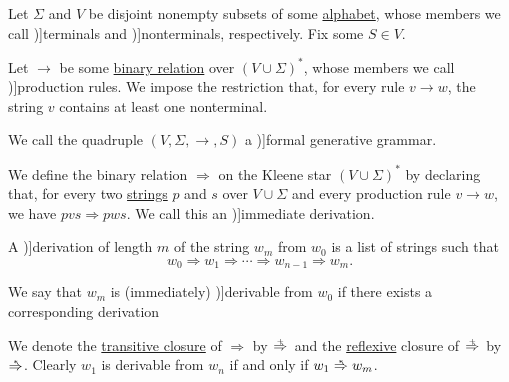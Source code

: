 \begin{definition}\label{def:formal_grammar}
  Let \( \Sigma \) and \( V \) be disjoint nonempty subsets of some \hyperref[def:formal_language]{alphabet}, whose members we call \term[ru=основные (символы) (\cite[27]{Гладкий1973Языки})]{terminals} and \term[ru=вспомогательные (символы) (\cite[27]{Гладкий1973Языки})]{nonterminals}, respectively. Fix some  \( S \in V \).

  Let \( \to \) be some \hyperref[def:binary_relation]{binary relation} over \( (V \cup \Sigma)^* \), whose members we call \term[ru=правила (\cite[27]{Гладкий1973Языки})]{production rules}. We impose the restriction that, for every rule \( v \to w \), the string \( v \) contains at least one nonterminal.

  We call the quadruple \( (V, \Sigma, \to, S) \) a \term[ru=(формальная) генеративная грамматика (\cite[10]{Гладкий1973Языки})]{formal generative grammar}.

  \begin{thmenum}
     We define the binary relation \( \Rightarrow \) on the Kleene star \( (V \cup \Sigma)^* \) by declaring that, for every two \hyperref[def:formal_language/string]{strings} \( p \) and \( s \) over \( V \cup \Sigma \) and every production rule \( v \to w \), we have \( pvs \Rightarrow pws \). We call this an \term[ru=непосредственный (вывод) (\cite[28]{Гладкий1973Языки})]{immediate derivation}.

    A \term[ru=вывод (\cite[27]{Гладкий1973Языки})]{derivation} of length \( m \) of the string \( w_m \) from \( w_0 \) is a list of strings such that
    \begin{equation}\label{eq:def:formal_grammar/derivation}
      w_0
      \Rightarrow
      w_1
      \Rightarrow
      \cdots
      \Rightarrow
      w_{n-1}
      \Rightarrow
      w_m.
    \end{equation}

    We say that \( w_m \) is (immediately) \term[ru=выводимая (цепочка) (\cite[27]{Гладкий1973Языки})]{derivable} from \( w_0 \) if there exists a corresponding derivation

    We denote the \hyperref[def:relation_closures/transitive]{transitive closure} of \( \Rightarrow \) by \( \reloset + \Rightarrow \) and the \hyperref[def:relation_closures/reflexive]{reflexive} closure of \( \reloset + \Rightarrow \) by \( \reloset {*} \Rightarrow \). Clearly \( w_1 \) is derivable from \( w_n \) if and only if \( w_1 \reloset {*} \Rightarrow w_m \).


\end{thmenum}
\end{definition}
